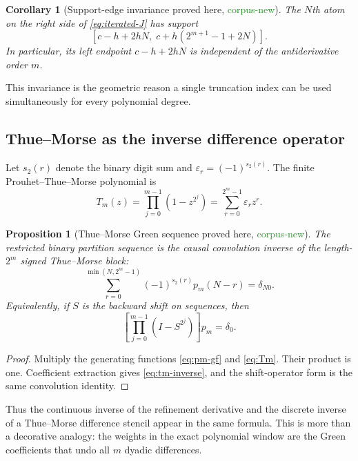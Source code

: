 \documentclass[11pt]{article}
\newtheorem{proposition}[theorem]{Proposition}
\newtheorem{corollary}[theorem]{Corollary}
\theoremstyle{definition}
\theoremstyle{remark}
\newcommand{\1}{\mathbf{1}}
\newcommand{\CorpusNew}{\textcolor{ForestGreen}{\textsf{corpus-new}}}
\newcommand{\ProvedHere}{\textcolor{BrickRed}{\textsf{proved here}}}
\begin{document}
\begin{corollary}[Support-edge invariance \ProvedHere, \CorpusNew]
\label{cor:support-edge}
The $N$th atom on the right side of \eqref{eq:iterated-J} has support
\begin{equation}
 \left[c-h+2hN,\;c+h(2^{m+1}-1+2N)\right].
 \label{eq:atom-support-general}
\end{equation}
In particular, its \emph{left} endpoint $c-h+2hN$ is independent of the
antiderivative order $m$.
\end{corollary}

This invariance is the geometric reason a single truncation index can be used
simultaneously for every polynomial degree.

\subsection{Thue--Morse as the inverse difference operator}

Let $s_2(r)$ denote the binary digit sum and
$\varepsilon_r=(-1)^{s_2(r)}$.  The finite Prouhet--Thue--Morse polynomial is
\begin{equation}
 T_m(z)=\prod_{j=0}^{m-1}(1-z^{2^j})
 =\sum_{r=0}^{2^m-1}\varepsilon_r z^r.
 \label{eq:Tm}
\end{equation}

\begin{proposition}[Thue--Morse Green sequence \ProvedHere, \CorpusNew]
\label{prop:tm-green}
The restricted binary partition sequence is the causal convolution inverse of
the length-$2^m$ signed Thue--Morse block:
\begin{equation}
 \sum_{r=0}^{\min(N,2^m-1)}
 (-1)^{s_2(r)}p_m(N-r)=\delta_{N0}.
 \label{eq:tm-inverse}
\end{equation}
Equivalently, if $S$ is the backward shift on sequences, then
\begin{equation}
 \left[\prod_{j=0}^{m-1}(I-S^{2^j})\right]p_m=\delta_0.
 \label{eq:tm-green-operator}
\end{equation}
\end{proposition}

\begin{proof}
Multiply the generating functions \eqref{eq:pm-gf} and \eqref{eq:Tm}.
Their product is one.  Coefficient extraction gives \eqref{eq:tm-inverse},
and the shift-operator form is the same convolution identity.
\end{proof}

Thus the continuous inverse of the refinement derivative and the discrete
inverse of a Thue--Morse difference stencil appear in the same formula.  This
is more than a decorative analogy: the weights in the exact polynomial window
are the Green coefficients that undo all $m$ dyadic differences.
\end{document}
